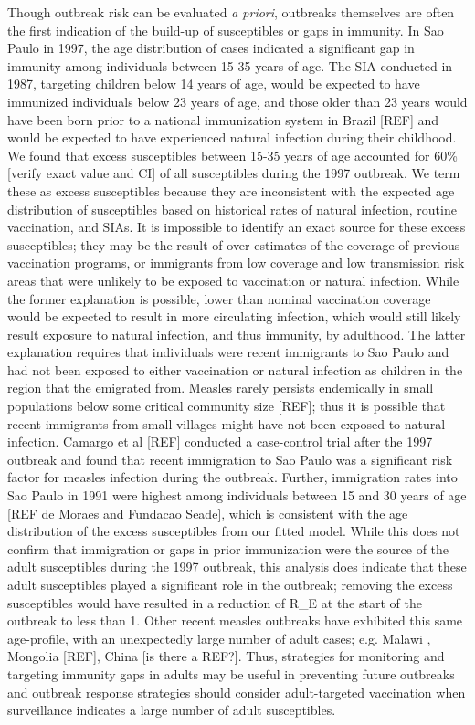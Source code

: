Though outbreak risk can be evaluated \emph{a priori}, outbreaks themselves are
often the first indication of the build-up of susceptibles or gaps in
immunity. In Sao Paulo in 1997, the age distribution of cases indicated
a significant gap in immunity among individuals between 15-35 years of
age. The SIA conducted in 1987, targeting children below 14 years of
age, would be expected to have immunized individuals below 23 years of
age, and those older than 23 years would have been born prior to a
national immunization system in Brazil {[}REF{]} and would be expected
to have experienced natural infection during their childhood. We found
that excess susceptibles between 15-35 years of age accounted for 60\%
{[}verify exact value and CI{]} of all susceptibles during the 1997
outbreak. We term these as excess susceptibles because they are
inconsistent with the expected age distribution of susceptibles based on
historical rates of natural infection, routine vaccination, and SIAs. It
is impossible to identify an exact source for these excess susceptibles;
they may be the result of over-estimates of the coverage of previous
vaccination programs, or immigrants from low coverage and low
transmission risk areas that were unlikely to be exposed to vaccination
or natural infection. While the former explanation is possible, lower
than nominal vaccination coverage would be expected to result in more
circulating infection, which would still likely result exposure to
natural infection, and thus immunity, by adulthood. The latter
explanation requires that individuals were recent immigrants to Sao
Paulo and had not been exposed to either vaccination or natural
infection as children in the region that the emigrated from. Measles
rarely persists endemically in small populations below some critical
community size {[}REF{]}; thus it is possible that recent immigrants
from small villages might have not been exposed to natural infection.
Camargo et al {[}REF{]} conducted a case-control trial after the 1997
outbreak and found that recent immigration to Sao Paulo was a
significant risk factor for measles infection during the outbreak.
Further, immigration rates into Sao Paulo in 1991 were highest among
individuals between 15 and 30 years of age {[}REF de Moraes and Fundacao
Seade{]}, which is consistent with the age distribution of the excess
susceptibles from our fitted model. While this does not confirm that
immigration or gaps in prior immunization were the source of the adult
susceptibles during the 1997 outbreak, this analysis does indicate that
these adult susceptibles played a significant role in the outbreak;
removing the excess susceptibles would have resulted in a reduction of
R\_E at the start of the outbreak to less than 1. Other recent measles
outbreaks have exhibited this same age-profile, with an unexpectedly
large number of adult cases; e.g. Malawi \cite{Minetti_2013}, Mongolia
{[}REF{]}, China {[}is there a REF?{]}. Thus, strategies for monitoring
and targeting immunity gaps in adults may be useful in preventing future
outbreaks and outbreak response strategies should consider
adult-targeted vaccination when surveillance indicates a large number of
adult susceptibles.

